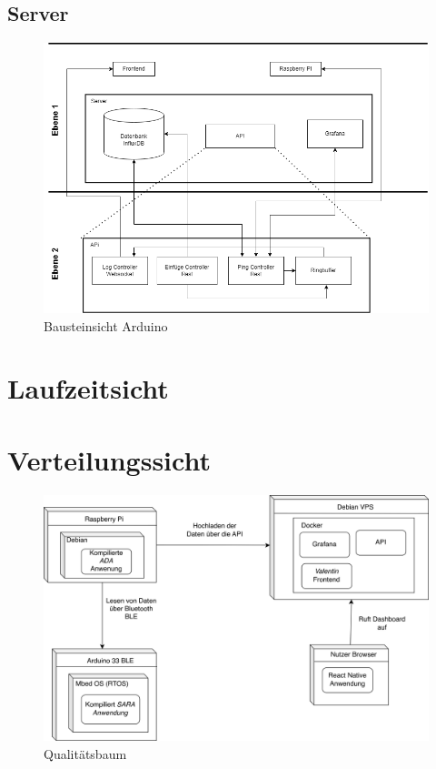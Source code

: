 \documentclass[
]{article}
\begin{document}
\subsection{Server}
\begin{figure}[htbp]
	\centering
	\includegraphics[width=130mm]{resources/Bausteinsicht_Server.png}
	\caption{Bausteinsicht Arduino}
	\label{fig:BausteinServer}
\end{figure}  

\section{Laufzeitsicht}

\newpage
\section{Verteilungssicht}

\begin{figure}[htbp]
	\centering
	\includegraphics[width=170mm]{resources/Verteilungssicht_Deployment.png}
	\caption{Qualitätsbaum}
	\label{fig:Qualitätsbaum}
\end{figure}  
\end{document}
